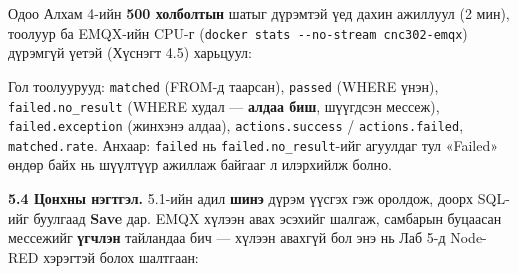 \begin{Shaded}
\begin{Highlighting}[]
\StringTok{:}\KeywordTok{\textbackslash{}}
  \KeywordTok{|} \VariableTok{)}
 
\StringTok{:} \KeywordTok{\textbackslash{}}
  \KeywordTok{|}  
\end{Highlighting}
\end{Shaded}

Одоо Алхам 4-ийн \textbf{500 холболтын} шатыг дүрэмтэй үед дахин ажиллуул (2 мин), тоолуур ба EMQX-ийн CPU-г (\texttt{docker\ stats\ -\/\allowbreak{}-no-stream\ cnc302-emqx}) дүрэмгүй үетэй (Хүснэгт 4.5) харьцуул:

\begin{Shaded}
\begin{Highlighting}[]
 \KeywordTok{\textbackslash{}}
  \OperatorTok{\textless{}}\OperatorTok{\textgreater{}}
\end{Highlighting}
\end{Shaded}

Гол тоолуурууд: \texttt{matched} (FROM-д таарсан), \texttt{passed} (WHERE үнэн), \texttt{failed.\allowbreak{}no\_\allowbreak{}result} (WHERE худал --- \textbf{алдаа биш}, шүүгдсэн мессеж), \texttt{failed.exception} (жинхэнэ алдаа), \texttt{actions.success} / \texttt{actions.failed}, \texttt{matched.rate}. Анхаар: \texttt{failed} нь \texttt{failed.\allowbreak{}no\_\allowbreak{}result}-ийг агуулдаг тул «Failed» өндөр байх нь шүүлтүүр ажиллаж байгааг л илэрхийлж болно.

\textbf{5.4 Цонхны нэгтгэл.} 5.1-ийн адил \textbf{шинэ} дүрэм үүсгэх гэж оролдож, доорх SQL-ийг буулгаад \textbf{Save} дар. EMQX хүлээн авах эсэхийг шалгаж, самбарын буцаасан мессежийг \textbf{үгчлэн} тайландаа бич --- хүлээн авахгүй бол энэ нь Лаб 5-д Node-RED хэрэгтэй болох шалтгаан:

